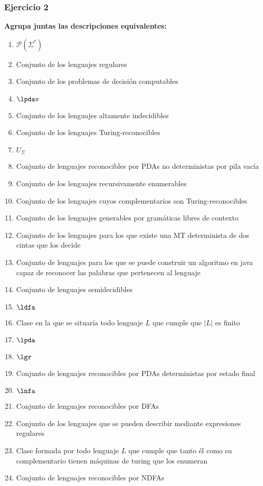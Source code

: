 \documentclass{article}
\begin{document}
\subsubsection*{Ejercicio 2}
\textbf{Agrupa juntas las descripciones equivalentes:}
\begin{enumerate}[1.]
\item $\mathcal{P}( \Sigma ^ *)$
\item Conjunto de los lenguajes regulares
\item  Conjunto de los problemas de decisión computables
\item $\lpdav$
\item  Conjunto de los lenguajes altamente indecidibles
\item  Conjunto de los lenguajes Turing-reconocibles
\item $U_{\Sigma}$
\item  Conjunto de lenguajes reconocibles por PDAs no deterministas por pila vacía
\item  Conjunto de los lenguajes recursivamente enumerables
\item  Conjunto de los lenguajes cuyos complementarios son Turing-reconocibles
\item  Conjunto de los lenguajes generables por gramáticas libres de contexto
\item  Conjunto de los lenguajes para los que existe una MT determinista de dos cintas que los decide
\item  Conjunto de lenguajes para los que se puede construir un algoritmo en java capaz de reconocer las palabras que pertenecen al lenguaje
\item  Conjunto de lenguajes semidecidibles 
\item $\ldfa$
\item  Clase en la que se situaría todo lenguaje $L$ que cumple que $|L|$ es finito
\item $\lpda$
\item $\lgr$
\item  Conjunto de lenguajes reconocibles por PDAs deterministas por estado final 
\item $\lnfa$
\item  Conjunto de lenguajes reconocibles por DFAs 
\item  Conjunto de los lenguajes que se pueden describir mediante expresiones regulares
\item  Clase formada por todo lenguaje $L$ que cumple que tanto él como su complementario tienen máquinas de turing que los enumeran 
\item  Conjunto de lenguajes reconocibles por NDFAs

\end{enumerate}
\end{document}
